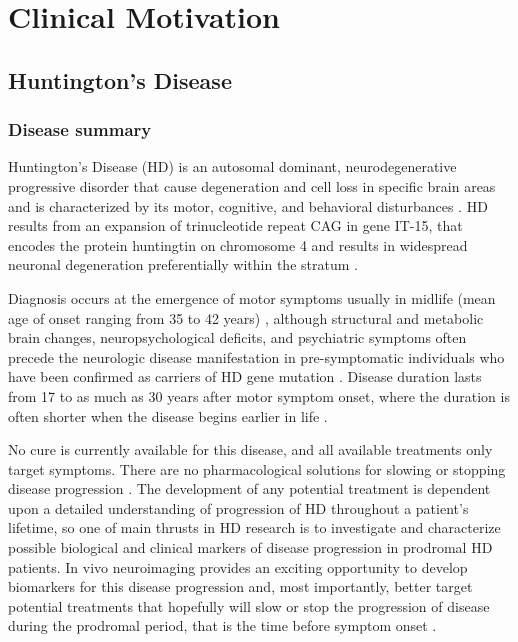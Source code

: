 \section{Clinical Motivation}
\label{clinicalBackground}

\subsection{Huntington's Disease}

\subsubsection{Disease summary}

\noindent Huntington's Disease (HD) is an autosomal dominant, neurodegenerative progressive disorder that cause degeneration and cell loss in specific brain areas and is characterized by its motor, cognitive, and behavioral disturbances \cite{PREDICTHD}. HD results from an expansion of trinucleotide repeat CAG in gene IT-15, that encodes the protein huntingtin on chromosome 4 \cite{Huntington1993} and results in widespread neuronal degeneration preferentially within the stratum \cite{Montoya2006}.

Diagnosis occurs at the emergence of motor symptoms usually in midlife (mean age of onset ranging from 35 to 42 years) \cite{Martin1986}, although structural and metabolic brain changes, neuropsychological deficits, and psychiatric symptoms often precede the neurologic disease manifestation in pre-symptomatic individuals who have been confirmed as carriers of HD gene mutation \cite{Paulsen2001, Campodonico1998, Aylward2000, Harris1999}. Disease duration lasts from 17 to as much as 30 years after motor symptom onset, where the duration is often shorter when the disease begins earlier in life \cite{Martin1986, Gomez-Tortosa2001}.

No cure is currently available for this disease, and all available treatments only target symptoms. There are no pharmacological solutions for slowing or stopping disease progression \cite{Frank2010}. The development of any potential treatment is dependent upon a detailed understanding of progression of HD throughout a patient's lifetime, so one of main thrusts in HD research is to investigate and characterize possible biological and clinical markers of disease progression in prodromal HD patients. In vivo neuroimaging provides an exciting opportunity to develop biomarkers for this disease progression and, most importantly, better target potential treatments that hopefully will slow or stop the progression of disease during the prodromal period, that is the time before symptom onset \cite{Paulsen2008}.
\newline

